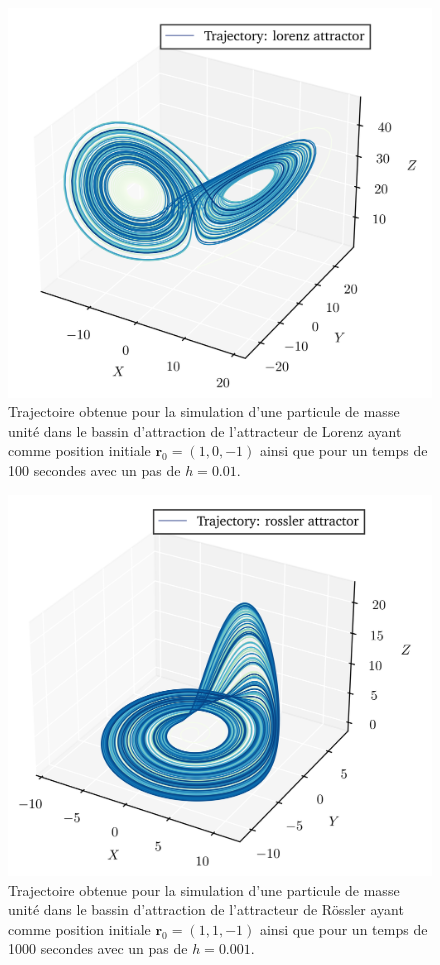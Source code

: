     \begin{figure}[h!]
        \centering
        \includegraphics[scale=0.6]{figs/trajectories/traj_lorenz.png}
        \caption{Trajectoire obtenue pour la simulation d'une particule de
        masse unité dans le bassin d'attraction de l'attracteur de Lorenz ayant
    comme position initiale $\bm{r}_0 = (1, 0, -1)$ ainsi que pour un temps de
100 secondes avec un pas de $h = 0.01$.}
        \label{fig: traj_lorenz}
    \end{figure}
    \vspace{1cm}
    \begin{figure}[h!]
        \centering
        \includegraphics[scale=0.6]{figs/trajectories/traj_rossler.png}
        \caption{Trajectoire obtenue pour la simulation d'une particule de
        masse unité dans le bassin d'attraction de l'attracteur de Rössler ayant
    comme position initiale $\bm{r}_0 = (1, 1, -1)$ ainsi que pour un temps de
1000 secondes avec un pas de $h = 0.001$.}
        \label{fig: traj_rossler}
    \end{figure}

